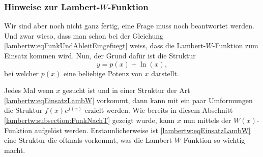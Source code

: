 \subsubsection{Hinweise zur Lambert-\(W\)-Funktion
	\label{lambertw:subsubsection:HinwLambertW}}
Wir sind aber noch nicht ganz fertig, eine Frage muss noch beantwortet werden. Und zwar wieso, dass man schon bei der Gleichung \eqref{lambertw:eqFunkUndAbleitEingefuegt} weiss, dass die Lambert-\(W\)-Funktion zum Einsatz kommen wird.
Nun, der Grund dafür ist die Struktur
\begin{equation}
	y
	=
	p(x) +\operatorname{ln}(x),
	\label{lambertw:eqEinsatzLambW}
\end{equation}
bei welcher \(p(x)\) eine beliebige Potenz von \(x\) darstellt. 

Jedes Mal wenn \(x\) gesucht ist und in einer Struktur der Art \eqref{lambertw:eqEinsatzLambW} vorkommt, dann kann mit ein paar Umformungen die Struktur \(f(x)e^{f(x)}\) erzielt werden. Wie bereits in diesem Abschnitt \ref{lambertw:subsection:FunkNachT} gezeigt wurde, kann \(x\) nun mittels der \(W(x)\)-Funktion aufgelöst werden. Erstaunlicherweise ist \eqref{lambertw:eqEinsatzLambW} eine Struktur die oftmals vorkommt, was die Lambert-\(W\)-Funktion so wichtig macht.